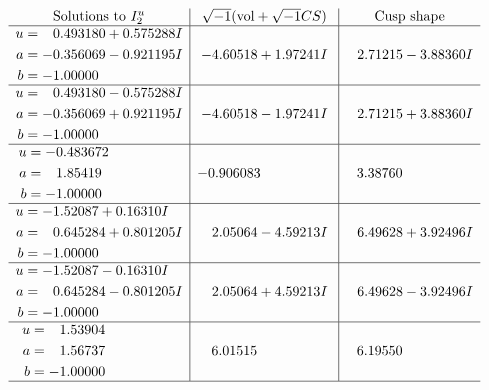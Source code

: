 \documentclass[1p]{elsarticle_modified}
\theoremstyle{definition}
\newcommand{\I}{\sqrt{-1}}
\begin{document}
$$\begin{array}{c|c|c}  
\text{Solutions to }I^u_{2}& \I (\text{vol} + \sqrt{-1}CS) & \text{Cusp shape}\\
 \hline 
\begin{aligned}
u &= \phantom{-}0.493180 + 0.575288 I \\
a &= -0.356069 - 0.921195 I \\
b &= -1.00000\phantom{ +0.000000I}\end{aligned}
 & -4.60518 + 1.97241 I & \phantom{-}2.71215 - 3.88360 I \\ \hline\begin{aligned}
u &= \phantom{-}0.493180 - 0.575288 I \\
a &= -0.356069 + 0.921195 I \\
b &= -1.00000\phantom{ +0.000000I}\end{aligned}
 & -4.60518 - 1.97241 I & \phantom{-}2.71215 + 3.88360 I \\ \hline\begin{aligned}
u &= -0.483672\phantom{ +0.000000I} \\
a &= \phantom{-}1.85419\phantom{ +0.000000I} \\
b &= -1.00000\phantom{ +0.000000I}\end{aligned}
 & -0.906083\phantom{ +0.000000I} & \phantom{-}3.38760\phantom{ +0.000000I} \\ \hline\begin{aligned}
u &= -1.52087 + 0.16310 I \\
a &= \phantom{-}0.645284 + 0.801205 I \\
b &= -1.00000\phantom{ +0.000000I}\end{aligned}
 & \phantom{-}2.05064 - 4.59213 I & \phantom{-}6.49628 + 3.92496 I \\ \hline\begin{aligned}
u &= -1.52087 - 0.16310 I \\
a &= \phantom{-}0.645284 - 0.801205 I \\
b &= -1.00000\phantom{ +0.000000I}\end{aligned}
 & \phantom{-}2.05064 + 4.59213 I & \phantom{-}6.49628 - 3.92496 I \\ \hline\begin{aligned}
u &= \phantom{-}1.53904\phantom{ +0.000000I} \\
a &= \phantom{-}1.56737\phantom{ +0.000000I} \\
b &= -1.00000\phantom{ +0.000000I}\end{aligned}
 & \phantom{-}6.01515\phantom{ +0.000000I} & \phantom{-}6.19550\phantom{ +0.000000I}\\
 \hline 
 \end{array}$$\newpage
\end{document}

